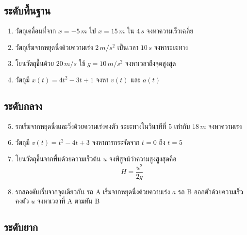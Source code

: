 \subsection*{ระดับพื้นฐาน}

\begin{enumerate}
    \item วัตถุเคลื่อนที่จาก $x=-5\,\si{m}$ ไป $x=15\,\si{m}$ ใน $4\,\si{s}$ จงหาความเร็วเฉลี่ย
    \item วัตถุเริ่มจากหยุดนิ่งด้วยความเร่ง $2\,\si{m/s^2}$ เป็นเวลา $10\,\si{s}$ จงหาระยะทาง
    \item โยนวัตถุขึ้นด้วย $20\,\si{m/s}$ ใช้ $g=10\,\si{m/s^2}$ จงหาเวลาถึงจุดสูงสุด
    \item วัตถุมี $x(t)=4t^2-3t+1$ จงหา $v(t)$ และ $a(t)$
\end{enumerate}

\subsection*{ระดับกลาง}

\begin{enumerate}
    \setcounter{enumi}{4}
    \item รถเริ่มจากหยุดนิ่งและวิ่งด้วยความเร่งคงตัว ระยะทางในวินาทีที่ 5 เท่ากับ $18\,\si{m}$ จงหาความเร่ง
    \item วัตถุมี $v(t)=t^2-4t+3$ จงหาการกระจัดจาก $t=0$ ถึง $t=5$
    \item โยนวัตถุขึ้นจากพื้นด้วยความเร็วต้น $u$ จงพิสูจน์ว่าความสูงสูงสุดคือ
    \[
    H=\frac{u^2}{2g}
    \]
    \item รถสองคันเริ่มจากจุดเดียวกัน รถ A เริ่มจากหยุดนิ่งด้วยความเร่ง $a$ รถ B ออกตัวด้วยความเร็วคงตัว $u$ จงหาเวลาที่ A ตามทัน B
\end{enumerate}

\subsection*{ระดับยาก}

